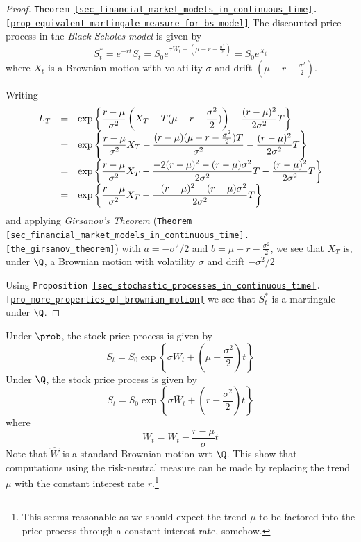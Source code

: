 \documentclass[11pt,a4paper]{article}
\begin{document}
  \begin{proof}{\texttt{Theorem \ref{sec_financial_market_models_in_continuous_time}.\ref{prop_equivalent_martingale_measure_for_bs_model}}}
    The discounted price process in the \textit{Black-Scholes model} is given by
    \[ S_t^*=e^{-rt}S_t=S_0e^{\sigma W_t+\left(\mu-r-\frac{\sigma^2}2\right)}=S_0e^{X_t} \]
    where $X_t$ is a Brownian motion with volatility $\sigma$ and drift $\left(\mu-r-\frac{\sigma^2}2\right)$.
    \par Writing
    \[\everymath={\displaystyle}\begin{array}{rcl}
      L_T&=&\exp\left\{\frac{r-\mu}{\sigma^2}\left(X_T-T(\mu-r-\frac{\sigma^2}2)\right)-\frac{(r-\mu)^2}{2\sigma^2}T\right\}\\
      &=&\exp\left\{\frac{r-\mu}{\sigma^2}X_T-\frac{(r-\mu)(\mu-r-\frac{\sigma^2}2)T}{\sigma^2}-\frac{(r-\mu)^2}{2\sigma^2}T\right\}\\
      &=&\exp\left\{\frac{r-\mu}{\sigma^2}X_T-\frac{-2(r-\mu)^2-(r-\mu)\sigma^2}{2\sigma^2}T-\frac{(r-\mu)^2}{2\sigma^2}T\right\}\\
      &=&\exp\left\{\frac{r-\mu}{\sigma^2}X_T-\frac{-(r-\mu)^2-(r-\mu)\sigma^2}{2\sigma^2}T\right\}
    \end{array}\]
    and applying \textit{Girsanov's Theorem} (\texttt{Theorem \ref{sec_financial_market_models_in_continuous_time}.\ref{the_girsanov_theorem}}) with $a=-\sigma^2/2$ and $b=\mu-r-\frac{\sigma^2}2$, we see that $X_T$ is, under $\Q$, a Brownian motion with volatility $\sigma$ and drift $-\sigma^2/2$
    \par Using \texttt{Proposition \ref{sec_stochastic_processes_in_continuous_time}.\ref{pro_more_properties_of_brownian_motion}} we see that $S_t^*$ is a martingale under $\Q$. \proved
  \end{proof}

  \begin{remark}{}
    Under $\prob$, the stock price process is given by
    \[ S_t=S_0\exp\left\{\sigma W_t+(\mu-\frac{\sigma^2}2)t\right\} \]
    Under $\Q$, the stock price process is given by
    \[ S_t=S_0\exp\left\{\sigma\bar{W}_t+(r-\frac{\sigma^2}2)t\right\} \]
    where
    \[ \bar{W}_t=W_t-\frac{r-\mu}\sigma t \]
    Note that $\hat{W}$ is a standard Brownian motion wrt $\Q$. This show that computations using the risk-neutral measure can be made by replacing the trend $\mu$ with the constant interest rate $r$.\footnote{This seems reasonable as we should expect the trend $\mu$ to be factored into the price process through a constant interest rate, somehow.}
  \end{remark}
\end{document}
